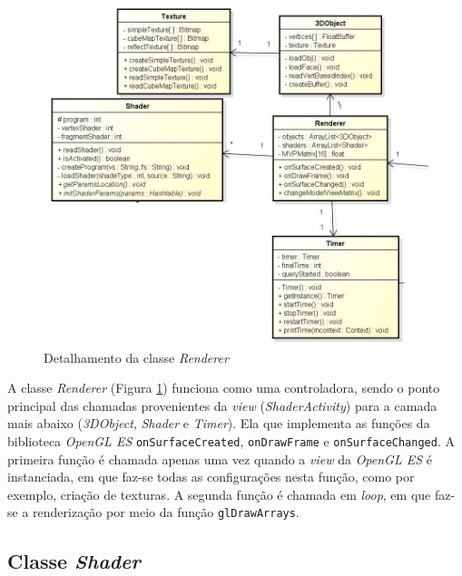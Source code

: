 	\begin{figure}[h]
	\centering
		\includegraphics[keepaspectratio=true,scale=0.6]{figuras/renderer.jpg}
	\caption{Detalhamento da classe \textit{Renderer}}
	\label{renderer}
	\end{figure}

	A classe \textit{Renderer} (Figura \ref{renderer}) funciona como uma controladora, sendo o ponto principal  das chamadas provenientes da \textit{view} (\textit{ShaderActivity}) para a camada mais abaixo (\textit{3DObject}, \textit{Shader} e \textit{Timer}). Ela que implementa as funções da biblioteca \textit{OpenGL ES} \texttt{onSurfaceCreated},  \texttt{onDrawFrame} e \texttt{onSurfaceChanged}. A primeira função é chamada apenas uma vez quando a \textit{view} da \textit{OpenGL ES} é instanciada, em que faz-se todas as configurações nesta função, como por exemplo, criação de texturas. A segunda função é chamada em \textit{loop}, em que faz-se a renderização por meio da função \texttt{glDrawArrays}. 

	\subsection{Classe \textit{Shader}}      

